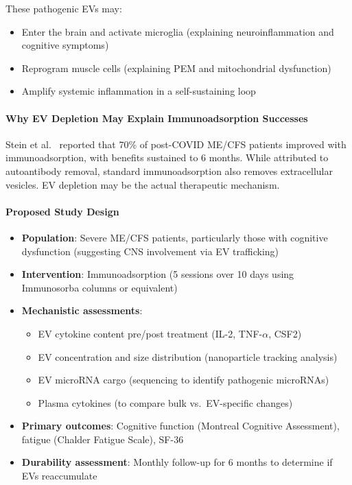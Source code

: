 These pathogenic EVs may:
\begin{itemize}
    \item Enter the brain and activate microglia (explaining neuroinflammation and cognitive symptoms)
    \item Reprogram muscle cells (explaining PEM and mitochondrial dysfunction)
    \item Amplify systemic inflammation in a self-sustaining loop
\end{itemize}

\paragraph{Why EV Depletion May Explain Immunoadsorption Successes}
Stein et al.~\cite{Stein2024immunoadsorption} reported that 70\% of post-COVID ME/CFS patients improved with immunoadsorption, with benefits sustained to 6 months. While attributed to autoantibody removal, standard immunoadsorption also removes extracellular vesicles. EV depletion may be the actual therapeutic mechanism.

\paragraph{Proposed Study Design}
\begin{itemize}
    \item \textbf{Population}: Severe ME/CFS patients, particularly those with cognitive dysfunction (suggesting CNS involvement via EV trafficking)
    \item \textbf{Intervention}: Immunoadsorption (5 sessions over 10 days using Immunosorba columns or equivalent)
    \item \textbf{Mechanistic assessments}:
    \begin{itemize}
        \item EV cytokine content pre/post treatment (IL-2, TNF-$\alpha$, CSF2)
        \item EV concentration and size distribution (nanoparticle tracking analysis)
        \item EV microRNA cargo (sequencing to identify pathogenic microRNAs)
        \item Plasma cytokines (to compare bulk vs.\ EV-specific changes)
    \end{itemize}
    \item \textbf{Primary outcomes}: Cognitive function (Montreal Cognitive Assessment), fatigue (Chalder Fatigue Scale), SF-36
    \item \textbf{Durability assessment}: Monthly follow-up for 6 months to determine if EVs reaccumulate
\end{itemize}

